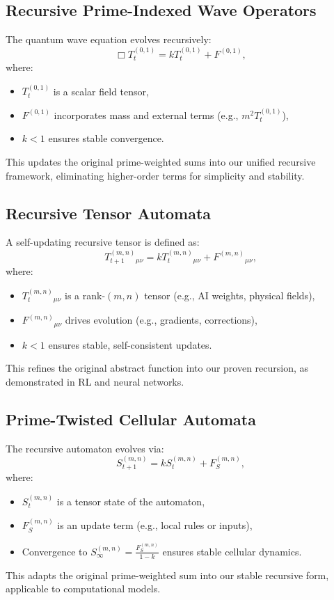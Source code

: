 \documentclass{article}
\theoremstyle{plain}
\begin{document}
\subsection{Recursive Prime-Indexed Wave Operators}
The quantum wave equation evolves recursively:
\begin{equation}
    \Box T_t^{(0,1)} = k T_t^{(0,1)} + F^{(0,1)},
\end{equation}
where:
\begin{itemize}
    \item \( T_t^{(0,1)} \) is a scalar field tensor,
    \item \( F^{(0,1)} \) incorporates mass and external terms (e.g., \( m^2 T_t^{(0,1)} \)),
    \item \( k < 1 \) ensures stable convergence.
\end{itemize}
This updates the original prime-weighted sums into our unified recursive framework, eliminating higher-order terms for simplicity and stability.

\subsection{Recursive Tensor Automata}
A self-updating recursive tensor is defined as:
\begin{equation}
    T_{t+1}^{(m,n)}{}_{\mu\nu} = k T_t^{(m,n)}{}_{\mu\nu} + F^{(m,n)}{}_{\mu\nu},
\end{equation}
where:
\begin{itemize}
    \item \( T_t^{(m,n)}{}_{\mu\nu} \) is a rank-$(m,n)$ tensor (e.g., AI weights, physical fields),
    \item \( F^{(m,n)}{}_{\mu\nu} \) drives evolution (e.g., gradients, corrections),
    \item \( k < 1 \) ensures stable, self-consistent updates.
\end{itemize}
This refines the original abstract function into our proven recursion, as demonstrated in RL and neural networks.

\subsection{Prime-Twisted Cellular Automata}
The recursive automaton evolves via:
\begin{equation}
    S_{t+1}^{(m,n)} = k S_t^{(m,n)} + F_S^{(m,n)},
\end{equation}
where:
\begin{itemize}
    \item \( S_t^{(m,n)} \) is a tensor state of the automaton,
    \item \( F_S^{(m,n)} \) is an update term (e.g., local rules or inputs),
    \item Convergence to \( S_\infty^{(m,n)} = \frac{F_S^{(m,n)}}{1 - k} \) ensures stable cellular dynamics.
\end{itemize}
This adapts the original prime-weighted sum into our stable recursive form, applicable to computational models.
\end{document}
